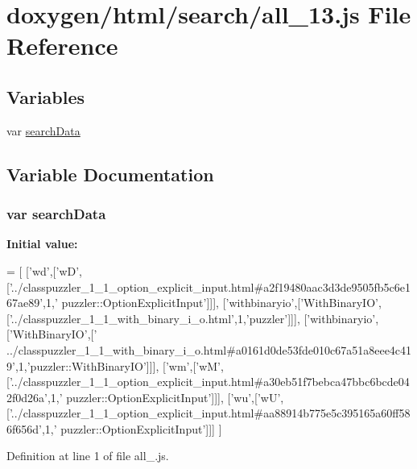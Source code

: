 \hypertarget{a00045}{}\section{doxygen/html/search/all\+\_\+13.js File Reference}
\label{a00045}
\subsection*{Variables}
\begin{DoxyCompactItemize}
\item 
var \hyperlink{a00045_ad01a7523f103d6242ef9b0451861231e}{search\+Data}
\end{DoxyCompactItemize}


\subsection{Variable Documentation}
\hypertarget{a00045_ad01a7523f103d6242ef9b0451861231e}{}
\subsubsection[{search\+Data}]{\setlength{\rightskip}{0pt plus 5cm}var search\+Data}\label{a00045_ad01a7523f103d6242ef9b0451861231e}
{\bfseries Initial value\+:}
\begin{DoxyCode}
=
[
  [\textcolor{stringliteral}{'wd'},[\textcolor{stringliteral}{'wD'},[\textcolor{stringliteral}{'../classpuzzler\_1\_1\_option\_explicit\_input.html#a2f19480aac3d3de9505fb5c6e167ae89'},1,\textcolor{stringliteral}{'
      puzzler::OptionExplicitInput'}]]],
  [\textcolor{stringliteral}{'withbinaryio'},[\textcolor{stringliteral}{'WithBinaryIO'},[\textcolor{stringliteral}{'../classpuzzler\_1\_1\_with\_binary\_i\_o.html'},1,\textcolor{stringliteral}{'puzzler'}]]],
  [\textcolor{stringliteral}{'withbinaryio'},[\textcolor{stringliteral}{'WithBinaryIO'},[\textcolor{stringliteral}{'
      ../classpuzzler\_1\_1\_with\_binary\_i\_o.html#a0161d0de53fde010c67a51a8eee4c419'},1,\textcolor{stringliteral}{'puzzler::WithBinaryIO'}]]],
  [\textcolor{stringliteral}{'wm'},[\textcolor{stringliteral}{'wM'},[\textcolor{stringliteral}{'../classpuzzler\_1\_1\_option\_explicit\_input.html#a30eb51f7bebca47bbc6bcde042f0d26a'},1,\textcolor{stringliteral}{'
      puzzler::OptionExplicitInput'}]]],
  [\textcolor{stringliteral}{'wu'},[\textcolor{stringliteral}{'wU'},[\textcolor{stringliteral}{'../classpuzzler\_1\_1\_option\_explicit\_input.html#aa88914b775e5c395165a60ff586f656d'},1,\textcolor{stringliteral}{'
      puzzler::OptionExplicitInput'}]]]
]
\end{DoxyCode}


Definition at line 1 of file all\+\_.\+js.

